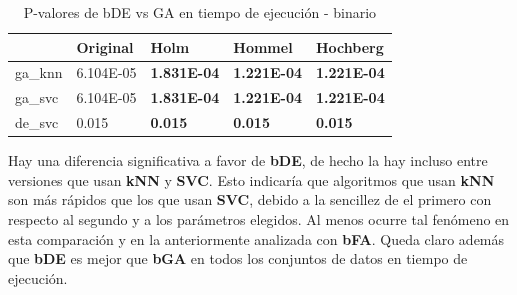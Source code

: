 \begin{table}[htb]
    \centering
    \begin{tabular}{lllll}
        \toprule
        {}      & Original  & Holm               & Hommel             & Hochberg           \\
        \midrule
        ga\_knn & 6.104E-05 & \textbf{1.831E-04} & \textbf{1.221E-04} & \textbf{1.221E-04} \\
        ga\_svc & 6.104E-05 & \textbf{1.831E-04} & \textbf{1.221E-04} & \textbf{1.221E-04} \\
        de\_svc & 0.015     & \textbf{0.015}     & \textbf{0.015}     & \textbf{0.015}     \\
        \bottomrule
    \end{tabular}
    \caption{P-valores de bDE vs GA en tiempo de ejecución - binario}
    \label{tab:de_vs_ga-bin_exec_time}
\end{table}

Hay una diferencia significativa a favor de \textbf{bDE}, de hecho la hay incluso entre versiones que usan \textbf{kNN} y \textbf{SVC}. Esto indicaría que algoritmos que usan \textbf{kNN} son más rápidos que los que usan \textbf{SVC}, debido a la sencillez de el primero con respecto al segundo y a los parámetros elegidos. Al menos ocurre tal fenómeno en esta comparación y en la anteriormente analizada con \textbf{bFA}. Queda claro además que \textbf{bDE} es mejor que \textbf{bGA} en todos los conjuntos de datos en tiempo de ejecución.


